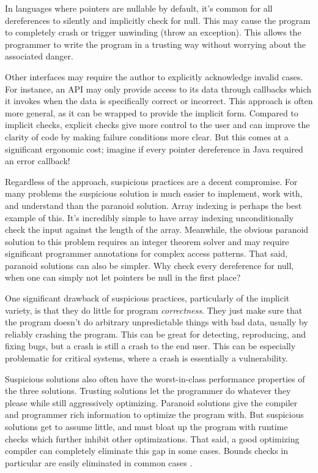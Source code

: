 In languages where pointers are nullable by default, it's common for all dereferences
to silently and implicitly check for null. This may cause the program to completely
crash or trigger unwinding (throw an exception). This allows the programmer
to write the program in a trusting way without worrying about the associated danger.

Other interfaces may require the author to explicitly acknowledge invalid cases.
For instance, an API may only provide access to its data through callbacks which it
invokes when the data is specifically correct or incorrect. This approach is often
more general, as it can be wrapped to provide the implicit form. Compared to
implicit checks, explicit checks give more control to the user and can improve the
clarity of code by making failure conditions more clear. But this comes at
a significant ergonomic cost; imagine if every pointer dereference in Java
required an error callback!

Regardless of the approach, suspicious practices are a decent compromise. For
many problems the suspicious solution is much easier to implement, work with,
and understand than the paranoid solution. Array indexing is perhaps the best
example of this. It's incredibly simple to have array indexing unconditionally
check the input against the length of the array. Meanwhile, the obvious paranoid
solution to this problem requires an integer theorem solver and may require
significant programmer annotations for complex access patterns. That said,
paranoid solutions can also be simpler. Why check every dereference for
null, when one can simply not let pointers be null in the first place?

One significant drawback of suspicious practices, particularly of the implicit
variety, is that they do little for program \emph{correctness}. They just make sure
that the program doesn't do arbitrary unpredictable things with bad data, usually by
reliably crashing the program. This can be great for detecting, reproducing,
and fixing bugs, but a crash is still a crash to the end user. This can be
especially problematic for critical systems, where a crash is essentially a
vulnerability.

Suspicious solutions also often have the worst-in-class performance properties
of the three solutions. Trusting solutions let the programmer do whatever they
please while still aggressively optimizing. Paranoid solutions give the
compiler and programmer rich information to optimize the program with.
But suspicious solutions get to assume little, and must bloat up
the program with runtime checks which further inhibit other optimizations.
That said, a good optimizing compiler can completely eliminate this gap in
some cases. Bounds checks in particular are easily eliminated in common cases
\cite{grosser2011polly}.




